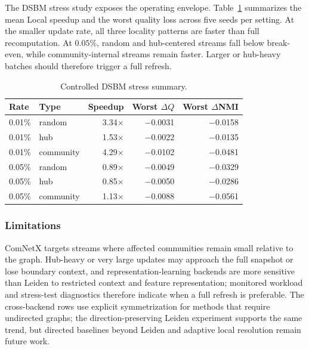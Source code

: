 \documentclass[conference]{IEEEtran}
\theoremstyle{definition}
\begin{document}
The DSBM stress study exposes the operating envelope. Table~\ref{tab:dsbm-stress}
summarizes the mean Local speedup and the worst quality loss across five seeds
per setting. At the smaller update rate, all three locality patterns are faster
than full recomputation. At $0.05\%$, random and hub-centered streams fall
below break-even, while community-internal streams remain faster. Larger or
hub-heavy batches should therefore trigger a full refresh.

\begin{table}[H]
\centering
\caption{Controlled DSBM stress summary.}
\label{tab:dsbm-stress}
\setlength{\tabcolsep}{2pt}
\scriptsize
\begin{tabular}{@{}llrrr@{}}
\toprule
\textbf{Rate} & \textbf{Type} & \textbf{Speedup} &
\textbf{Worst $\Delta Q$} & \textbf{Worst $\Delta$NMI} \\
\midrule
0.01\% & random    & 3.34$\times$ & $-$0.0031 & $-$0.0158 \\
0.01\% & hub       & 1.53$\times$ & $-$0.0022 & $-$0.0135 \\
0.01\% & community & 4.29$\times$ & $-$0.0102 & $-$0.0481 \\
0.05\% & random    & 0.89$\times$ & $-$0.0049 & $-$0.0329 \\
0.05\% & hub       & 0.85$\times$ & $-$0.0050 & $-$0.0286 \\
0.05\% & community & 1.13$\times$ & $-$0.0088 & $-$0.0561 \\
\bottomrule
\end{tabular}
\end{table}

\subsubsection{Limitations}

ComNetX targets streams where affected communities remain small relative to the
graph. Hub-heavy or very large updates may approach the full snapshot or lose
boundary context, and representation-learning backends are more sensitive than
Leiden to restricted context and feature representation; monitored workload and
stress-test diagnostics therefore indicate when a full refresh is preferable.
The cross-backend rows use explicit symmetrization for methods that require
undirected graphs; the direction-preserving Leiden experiment supports the same
trend, but directed baselines beyond Leiden and adaptive local resolution remain future
work.
\end{document}
